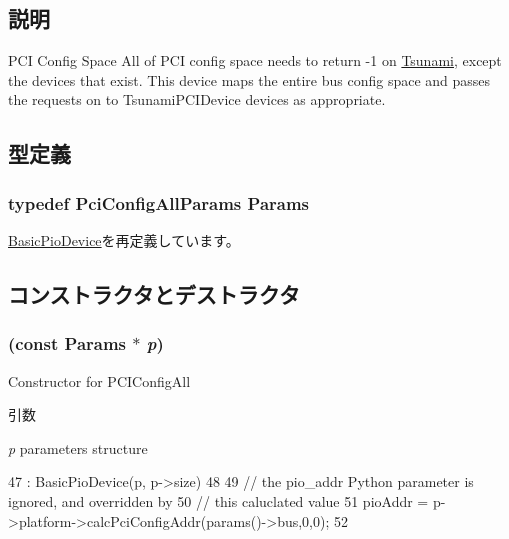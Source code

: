 \subsection{説明}
PCI Config Space All of PCI config space needs to return -\/1 on \hyperlink{classTsunami}{Tsunami}, except the devices that exist. This device maps the entire bus config space and passes the requests on to TsunamiPCIDevice devices as appropriate. 

\subsection{型定義}
\hypertarget{classPciConfigAll_a0488eba2a71c6661fef314d8ded28416}{
\subsubsection[{Params}]{\setlength{\rightskip}{0pt plus 5cm}typedef PciConfigAllParams {\bf Params}}}
\label{classPciConfigAll_a0488eba2a71c6661fef314d8ded28416}


\hyperlink{classBasicPioDevice_a2845515ac6467f10540747053c8a0449}{BasicPioDevice}を再定義しています。

\subsection{コンストラクタとデストラクタ}
\hypertarget{classPciConfigAll_a618458d1056b88674814a45722d1474e}{
\subsubsection[{PciConfigAll}]{ (const {\bf Params} $\ast$ {\em p})}}
\label{classPciConfigAll_a618458d1056b88674814a45722d1474e}
Constructor for PCIConfigAll 
\begin{DoxyParams}{引数}
\item[{\em p}]parameters structure \end{DoxyParams}



\begin{DoxyCode}
47     : BasicPioDevice(p, p->size)
48 {
49     // the pio_addr Python parameter is ignored, and overridden by
50     // this caluclated value
51     pioAddr = p->platform->calcPciConfigAddr(params()->bus,0,0);
52 }
\end{DoxyCode}



